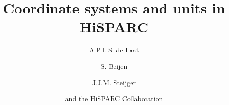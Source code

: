 \title{Coordinate systems and units in HiSPARC}

\author{A.P.L.S. de Laat \and S. Beijen \and J.J.M. Steijger \and
        and the HiSPARC Collaboration}



\maketitle



\printbibliography


